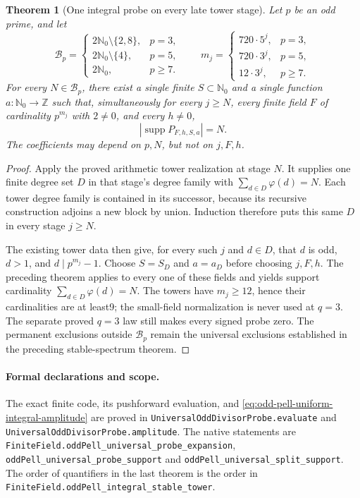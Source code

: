 \documentclass[11pt]{article}
\newtheorem{theorem}{Theorem}[section]
\begin{document}
\begin{theorem}[One integral probe on every late tower stage]
\label{thm:odd-pell-one-integral-stable-probe}
Let \(p\) be an odd prime, and let
\[
 \mathcal B_p=
 \begin{cases}
  2\mathbb N_0\setminus\{2,8\},&p=3,\\
  2\mathbb N_0\setminus\{4\},&p=5,\\
  2\mathbb N_0,&p\ge7.
 \end{cases}
 \qquad
 m_j=
 \begin{cases}
 720\cdot5^j,&p=3,\\
 720\cdot3^j,&p=5,\\
 12\cdot3^j,&p\ge7.
 \end{cases}
\]
For every \(N\in\mathcal B_p\), there exist a single finite
\(S\subset\mathbb N_0\) and a single function \(a:\mathbb N_0\to\mathbb Z\)
such that, simultaneously for every \(j\ge N\), every finite field
\(F\) of cardinality \(p^{m_j}\) with \(2\ne0\), and every \(h\ne0\),
\[
 |\operatorname{supp}P_{F,h,S,a}|=N.
\]
The coefficients may depend on \(p,N\), but not on \(j,F,h\).
\end{theorem}
\begin{proof}
Apply the proved arithmetic tower realization at stage \(N\).
It supplies one finite degree set \(D\) in that stage's degree family
with \(\sum_{d\in D}\varphi(d)=N\).
Each tower degree family is contained in its successor, because its
recursive construction adjoins a new block by union.
Induction therefore puts this same \(D\) in every stage \(j\ge N\).

The existing tower data then give, for every such \(j\) and \(d\in D\),
that \(d\) is odd, \(d>1\), and \(d\mid p^{m_j}-1\).
Choose \(S=S_D\) and \(a=a_D\) before choosing \(j,F,h\).
The preceding theorem applies to every one of these fields and yields
support cardinality \(\sum_{d\in D}\varphi(d)=N\).
The towers have \(m_j\ge12\), hence their cardinalities are at least9;
the small-field normalization is never used at \(q=3\).
The separate proved \(q=3\) law still makes every signed probe zero.
The permanent exclusions outside \(\mathcal B_p\) remain the universal
exclusions established in the preceding stable-spectrum theorem.
\end{proof}

\paragraph{Formal declarations and scope.}
The exact finite code, its pushforward evaluation, and
\eqref{eq:odd-pell-uniform-integral-amplitude} are proved in
\texttt{UniversalOddDivisorProbe.evaluate} and
\texttt{UniversalOddDivisorProbe.amplitude}.
The native statements are
\texttt{FiniteField.oddPell\_universal\_probe\_expansion},
\texttt{oddPell\_universal\_probe\_support} and
\texttt{oddPell\_universal\_split\_support}.
The order of quantifiers in the last theorem is the order in
\texttt{FiniteField.oddPell\_integral\_stable\_tower}.
\end{document}
